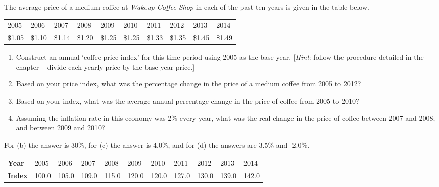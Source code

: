 \begin{enumialphparenastyle}
\begin{econex}\label{ex:ch2ex2}
The average price of a medium coffee at \textit{Wakeup Coffee Shop} in each of the past ten years is given in the table below.
\begin{Table}{}
\begin{tabu} to \linewidth {|X[1,c]X[1,c]X[1,c]X[1,c]X[1,c]X[1,c]X[1,c]X[1,c]X[1,c]X[1,c]|}	\hline
{}	2005	&	2006	&	2007	&	2008	&	2009	&	2010	&	2011	&	2012	&	2013	&	2014		\\
						\$1.05	&	\$1.10	&	\$1.14	&	\$1.20	&	\$1.25	&	\$1.25	&	\$1.33	&	\$1.35	&	\$1.45	&	\$1.49		\\	\hline
\end{tabu}
\end{Table}
\begin{enumerate}
	\item	Construct an annual `coffee price index' for this time period using 2005 as the base year. [\textit{Hint}: follow the procedure detailed in the chapter -- divide each yearly price by the base year price.]
	\item	Based on your price index, what was the percentage change in the price of a medium coffee from 2005 to 2012?
	\item	Based on your index, what was the average annual percentage change in the price of coffee from 2005 to 2010?
	\item	Assuming the inflation rate in this economy was 2\% every year, what was the real change in the price of coffee between 2007 and 2008; and between 2009 and 2010?
\end{enumerate}
\begin{econsolution}
	For (b) the answer is 30\%, for (c) the answer is 4.0\%, and for (d) the answers are 3.5\% and -2.0\%.
	\begin{Table}{}
	\begin{tabu} to \linewidth {|X[1,c]X[1,c]X[1,c]X[1,c]X[1,c]X[1,c]X[1,c]X[1,c]X[1,c]X[1,c]X[1,c]|}\hline
	\textbf{Year} & 2005	& 2006	& 2007	& 2008	& 2009	& 2010	& 2011	& 2012	& 2013	& 2014 	\\
						\textbf{Index}& 100.0	& 105.0 & 109.0 & 115.0 & 120.0 & 120.0 & 127.0 & 130.0 & 139.0 & 142.0 \\ \hline
	\end{tabu}
	\end{Table}
\end{econsolution}
\end{econex}


\end{enumialphparenastyle}

